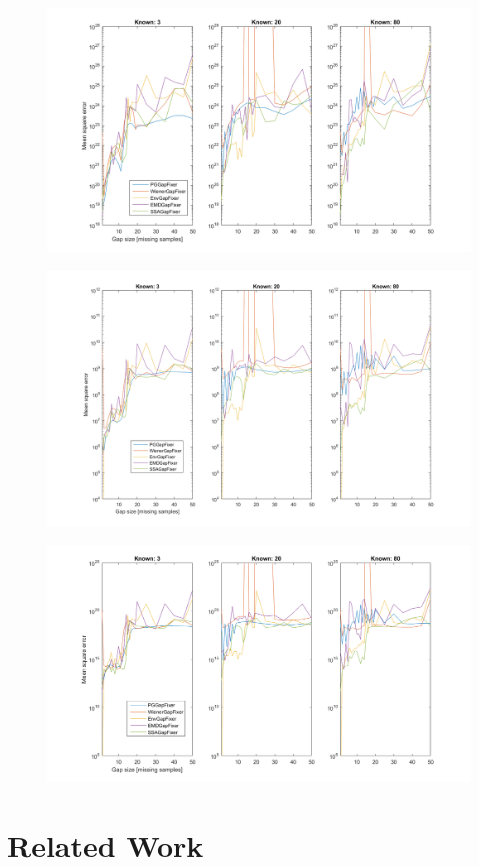 
\begin{figure}[H]
\centering
\includegraphics[width=1\textwidth]{billeder/RecFeq.png}
\caption{}
\label{fig:RecFeq}
\end{figure}

\begin{figure}[H]
\centering
\includegraphics[width=1\textwidth]{billeder/RecNorm.png}
\caption{}
\label{fig:RecFeq}
\end{figure}

\begin{figure}[H]
\centering
\includegraphics[width=1\textwidth]{billeder/RecGitter.png}
\caption{}
\label{fig:RecFeq}
\end{figure}

\section{Related Work}
